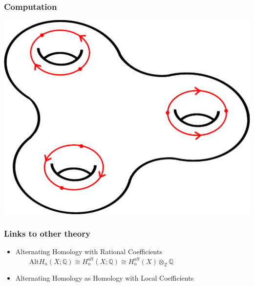 \documentclass{beamer}[10pt]
\theoremstyle{definition}
\begin{document}
\begin{frame}
\frametitle{Computation}
\centering
\includegraphics[scale=0.15]{Genus3AltHom1Generator.jpg}
\end{frame}



\begin{frame}
\frametitle{Links to other theory}
\begin{itemize}
\item Alternating Homology with Rational Coefficients \\
   $\quad\quad \text{Alt}H_n(X;\mathbb{Q})\cong H^{alt}_n(X;\mathbb{Q})\cong H^{alt}_n(X)\otimes_\mathbb{Z}\mathbb{Q}$
   \vspace{3mm}
\item Alternating Homology as Homology with Local Coefficients
\end{itemize}
\end{frame}
\end{document}
